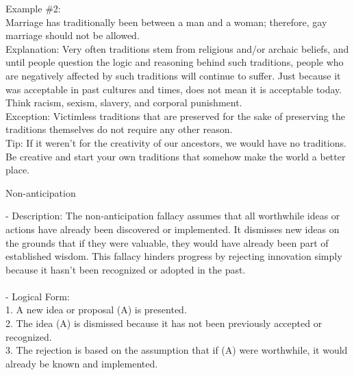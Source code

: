\documentclass[a4paper,12pt,single,pdftex]{scrartcl}
\begin{document}
{    
      Example \#2:
    \\

    
      Marriage has traditionally been between a man and a woman; therefore, gay marriage should not be allowed.
    \\

    
      Explanation:  Very often traditions stem from religious and/or archaic beliefs, and until people question the logic and reasoning behind such traditions, people who are negatively affected by such traditions will continue to suffer.  Just because it was acceptable in past cultures and times, does not mean it is acceptable today.  Think racism, sexism, slavery, and corporal punishment.
    \\

    
      Exception: Victimless traditions that are preserved for the sake of preserving the traditions themselves do not require any other reason.
    \\

    
      Tip: If it weren’t for the creativity of our ancestors, we would have no traditions.  Be creative and start your own traditions that somehow make the world a better place.
    \\

  }


Non-anticipation
    
      - Description: The non-anticipation fallacy assumes that all worthwhile ideas or actions have already been discovered or implemented. It dismisses new ideas on the grounds that if they were valuable, they would have already been part of established wisdom. This fallacy hinders progress by rejecting innovation simply because it hasn't been recognized or adopted in the past.
    \\

    
      
    \\

    
      - Logical Form:
    \\

    
        1. A new idea or proposal (A) is presented.
    \\

    
        2. The idea (A) is dismissed because it has not been previously accepted or recognized.
    \\

    
        3. The rejection is based on the assumption that if (A) were worthwhile, it would already be known and implemented.
    \\
\end{document}
